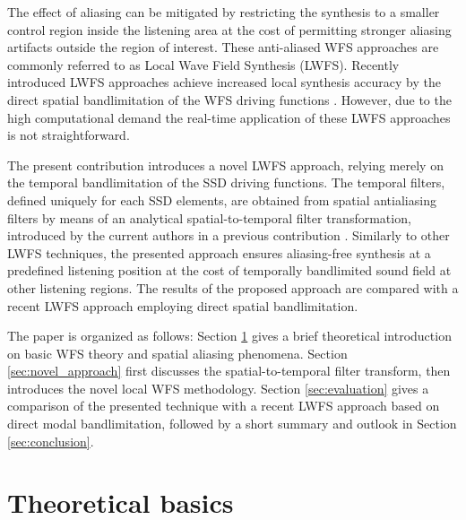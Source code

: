 \documentclass[conference]{IEEEtran}
\begin{document}
The effect of aliasing can be mitigated by restricting the synthesis to a smaller control region inside the listening area at the cost of permitting stronger aliasing artifacts outside the region of interest.
These anti-aliased WFS approaches are commonly referred to as Local Wave Field Synthesis (LWFS).
Recently introduced LWFS approaches achieve increased local synthesis accuracy by the direct spatial bandlimitation of the WFS driving functions \cite{Winter2016-TASL, Hahn16:AES, Hahn17:EUSIPCO, hahn2022cylindrical}.
However, due to the high computational demand the real-time application of these LWFS approaches is not straightforward.

The present contribution introduces a novel LWFS approach, relying merely on the temporal bandlimitation of the SSD driving functions.
The temporal filters, defined uniquely for each SSD elements, are obtained from spatial antialiasing filters by means of an analytical spatial-to-temporal filter transformation, introduced by the current authors in a previous contribution \cite{firtha_daga2023}.
Similarly to other LWFS techniques, the presented approach ensures aliasing-free synthesis at a predefined listening position at the cost of temporally bandlimited sound field at other listening regions.
The results of the proposed approach are compared with a recent LWFS approach employing direct spatial bandlimitation.

The paper is organized as follows:
Section \ref{sec:theory} gives a brief theoretical introduction on basic WFS theory and spatial aliasing phenomena. 
Section \ref{sec:novel_approach} first discusses the spatial-to-temporal filter transform, then introduces the novel local WFS methodology.
Section \ref{sec:evaluation} gives a comparison of the presented technique with a recent LWFS approach based on direct modal bandlimitation, followed by a short summary and outlook in Section \ref{sec:conclusion}. 

\section{Theoretical basics}
\label{sec:theory}
\end{document}
